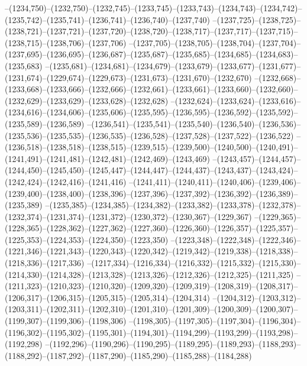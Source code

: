 --(1234,750)--(1232,750)--(1232,745)--(1233,745)--(1233,743)--(1234,743)--(1234,742)--(1235,742)--(1235,741)--(1236,741)--(1236,740)--(1237,740)
--(1237,725)--(1238,725)--(1238,721)--(1237,721)--(1237,720)--(1238,720)--(1238,717)--(1237,717)--(1237,715)--(1238,715)--(1238,706)--(1237,706)
--(1237,705)--(1238,705)--(1238,704)--(1237,704)--(1237,695)--(1236,695)--(1236,687)--(1235,687)--(1235,685)--(1234,685)--(1234,683)--(1235,683)
--(1235,681)--(1234,681)--(1234,679)--(1233,679)--(1233,677)--(1231,677)--(1231,674)--(1229,674)--(1229,673)--(1231,673)--(1231,670)--(1232,670)
--(1232,668)--(1233,668)--(1233,666)--(1232,666)--(1232,661)--(1233,661)--(1233,660)--(1232,660)--(1232,629)--(1233,629)--(1233,628)--(1232,628)
--(1232,624)--(1233,624)--(1233,616)--(1234,616)--(1234,606)--(1235,606)--(1235,595)--(1236,595)--(1236,592)--(1235,592)--(1235,589)--(1236,589)
--(1236,541)--(1235,541)--(1235,540)--(1236,540)--(1236,536)--(1235,536)--(1235,535)--(1236,535)--(1236,528)--(1237,528)--(1237,522)--(1236,522)
--(1236,518)--(1238,518)--(1238,515)--(1239,515)--(1239,500)--(1240,500)--(1240,491)--(1241,491)--(1241,481)--(1242,481)--(1242,469)--(1243,469)
--(1243,457)--(1244,457)--(1244,450)--(1245,450)--(1245,447)--(1244,447)--(1244,437)--(1243,437)--(1243,424)--(1242,424)--(1242,416)--(1241,416)
--(1241,411)--(1240,411)--(1240,406)--(1239,406)--(1239,400)--(1238,400)--(1238,396)--(1237,396)--(1237,392)--(1236,392)--(1236,389)--(1235,389)
--(1235,385)--(1234,385)--(1234,382)--(1233,382)--(1233,378)--(1232,378)--(1232,374)--(1231,374)--(1231,372)--(1230,372)--(1230,367)--(1229,367)
--(1229,365)--(1228,365)--(1228,362)--(1227,362)--(1227,360)--(1226,360)--(1226,357)--(1225,357)--(1225,353)--(1224,353)--(1224,350)--(1223,350)
--(1223,348)--(1222,348)--(1222,346)--(1221,346)--(1221,343)--(1220,343)--(1220,342)--(1219,342)--(1219,338)--(1218,338)--(1218,336)--(1217,336)
--(1217,334)--(1216,334)--(1216,332)--(1215,332)--(1215,330)--(1214,330)--(1214,328)--(1213,328)--(1213,326)--(1212,326)--(1212,325)--(1211,325)
--(1211,323)--(1210,323)--(1210,320)--(1209,320)--(1209,319)--(1208,319)--(1208,317)--(1206,317)--(1206,315)--(1205,315)--(1205,314)--(1204,314)
--(1204,312)--(1203,312)--(1203,311)--(1202,311)--(1202,310)--(1201,310)--(1201,309)--(1200,309)--(1200,307)--(1199,307)--(1199,306)--(1198,306)
--(1198,305)--(1197,305)--(1197,304)--(1196,304)--(1196,302)--(1195,302)--(1195,301)--(1194,301)--(1194,299)--(1193,299)--(1193,298)--(1192,298)
--(1192,296)--(1190,296)--(1190,295)--(1189,295)--(1189,293)--(1188,293)--(1188,292)--(1187,292)--(1187,290)--(1185,290)--(1185,288)--(1184,288)
